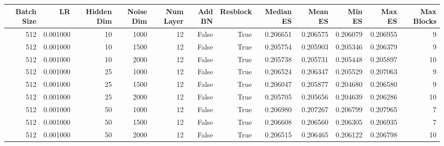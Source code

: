 \begin{tabular}{rrrrrrrrrrrr}
\toprule
Batch Size & LR & Hidden Dim & Noise Dim & Num Layer & Add BN & Resblock & Median ES & Mean ES & Min ES & Max ES & Max Blocks \\
\midrule
512 & 0.001000 & 10 & 1000 & 12 & False & True & 0.206651 & 0.206575 & 0.206079 & 0.206955 & 9 \\
512 & 0.001000 & 10 & 1500 & 12 & False & True & 0.205754 & 0.205903 & 0.205346 & 0.206379 & 9 \\
512 & 0.001000 & 10 & 2000 & 12 & False & True & 0.205738 & 0.205731 & 0.205448 & 0.205897 & 10 \\
512 & 0.001000 & 25 & 1000 & 12 & False & True & 0.206524 & 0.206347 & 0.205529 & 0.207063 & 9 \\
512 & 0.001000 & 25 & 1500 & 12 & False & True & 0.206047 & 0.205877 & 0.204680 & 0.206580 & 9 \\
512 & 0.001000 & 25 & 2000 & 12 & False & True & 0.205705 & 0.205656 & 0.204639 & 0.206286 & 10 \\
512 & 0.001000 & 50 & 1000 & 12 & False & True & 0.206980 & 0.207267 & 0.206799 & 0.207965 & 7 \\
512 & 0.001000 & 50 & 1500 & 12 & False & True & 0.206608 & 0.206560 & 0.206305 & 0.206935 & 7 \\
512 & 0.001000 & 50 & 2000 & 12 & False & True & 0.206515 & 0.206465 & 0.206122 & 0.206798 & 10 \\
\bottomrule
\end{tabular}
